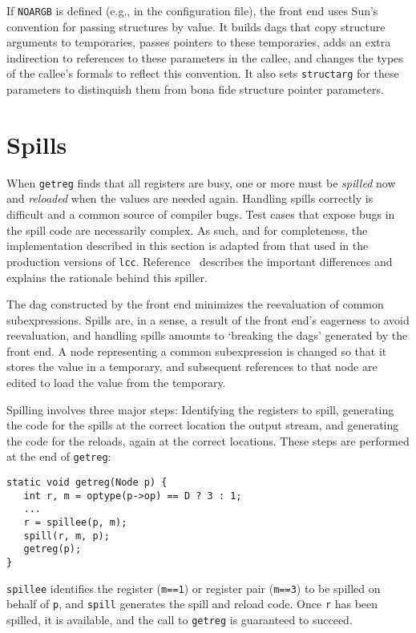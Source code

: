 If \verb|NOARGB| is defined (e.g., in the configuration file),
the front end uses Sun's convention for passing structures by value.
It builds dags that copy structure arguments to temporaries,
passes pointers to these temporaries, adds an extra indirection
to references to these parameters in the callee, and changes
the types of the callee's formals to reflect this convention.
It also sets \verb|structarg| for these parameters to distinquish
them from bona fide structure pointer parameters.

\section{Spills}

\label{spills}
When \verb|getreg| finds that all registers are busy,
one or more must be {\em spilled} now and {\em reloaded}
when the values are needed again.
Handling spills correctly is difficult and a common
source of compiler bugs. Test cases that expose
bugs in the spill code are necessarily complex.
As such, and for completeness,
the implementation described in this section is adapted
from that used in the production versions of \verb|lcc|.
Reference~\cite{fraser:hanson:92} describes the important
differences and explains the rationale behind this spiller.

The dag constructed by the front end minimizes the reevaluation of
common subexpressions. Spills are, in a sense,
a result of the front end's eagerness to avoid
reevaluation, and handling spills amounts to
`breaking the dags' generated by the front end.
A node representing a common subexpression is changed
so that it stores the value in a temporary, and
subsequent references to that node are edited
to load the value from the temporary.

Spilling involves three major steps:
Identifying the registers to spill,
generating the code for the spills at the correct
location the output stream, and
generating the code for the reloads, again at the correct locations.
These steps are performed at the end of \verb|getreg|:
\begin{verbatim}
static void getreg(Node p) {
   int r, m = optype(p->op) == D ? 3 : 1;
   ...
   r = spillee(p, m);
   spill(r, m, p);
   getreg(p);
}
\end{verbatim}
\verb|spillee| identifies the register (\verb|m==1|) or register pair (\verb|m==3|)
to be spilled on behalf of \verb|p|,
and \verb|spill| generates the spill and reload code.
Once \verb|r| has been spilled,
it is available,
and the call to \verb|getreg| is guaranteed to succeed.


